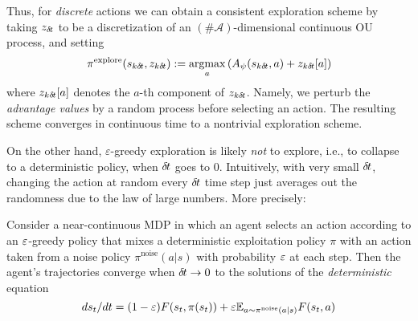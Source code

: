 Thus, for \emph{discrete} actions we can obtain a consistent
exploration scheme by taking
$z_{\delta\hspace{-.1em}t}$ to be a discretization of an $(\#\mathcal{A})$-dimensional
continuous OU process, and setting
\begin{equation}
  \pi^\text{explore}(s_{k{\delta\hspace{-.1em}t}}, z_{k{\delta\hspace{-.1em}t}})\mathrel{\mathop{:}}= \operatorname*{argmax}_{a}
  \left(A_\psi(s_{k{\delta\hspace{-.1em}t}}, a) + z_{k{\delta\hspace{-.1em}t}}[a]\right)
\end{equation}
where $z_{k{\delta\hspace{-.1em}t}}[a]$ denotes the $a$-th component of $z_{k{\delta\hspace{-.1em}t}}$. Namely,
we perturb the \emph{advantage values} by a random process before selecting an action. The
resulting scheme converges in continuous time to a nontrivial exploration
scheme.

On the other hand,
$\varepsilon$-greedy
exploration is likely \emph{not} to explore, i.e., to collapse to a deterministic
policy, when ${\delta\hspace{-.1em}t}$ goes to $0$.
Intuitively,
with very small ${\delta\hspace{-.1em}t}$, changing the action at random every ${\delta\hspace{-.1em}t}$ time
step just averages out the randomness due to the law of large numbers.
More precisely:%


\begin{theorem}
Consider a near-continuous MDP in which an agent selects an
action according to an $\varepsilon$-greedy policy that mixes a deterministic
exploitation policy $\pi$ with an action taken from a noise policy
$\pi^\text{noise}(a|s)$ with probability $\varepsilon$ at each step. Then the
agent's trajectories converge when ${\delta\hspace{-.1em}t}\to 0$ to the solutions of the
\emph{deterministic} equation
\begin{equation}
d s_t/dt= (1-\varepsilon) F(s_t,\pi(s_t))+\varepsilon \mathbb{E}_{a\sim
\pi^\text{noise}(a|s)}F(s_t,a)
\end{equation}
\end{theorem}

